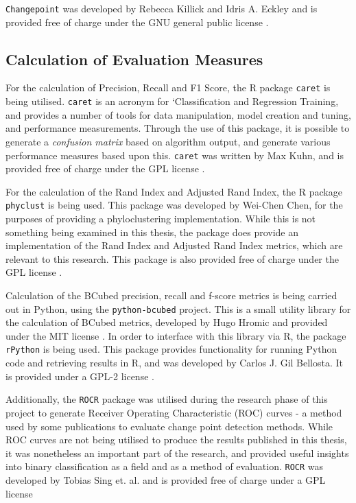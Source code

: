 \documentclass[../main.tex]{subfiles}
\begin{document}
\texttt{Changepoint} was developed by Rebecca Killick and Idris A. Eckley and is provided free of charge under the GNU general public license \cite{Killick2014}.

\subsection{Calculation of Evaluation Measures}

For the calculation of Precision, Recall and F1 Score, the \textsf{R} package \texttt{caret} is being utilised. \texttt{caret} is an acronym for `Classification and Regression Training, and provides a number of tools for data manipulation, model creation and tuning, and performance measurements. Through the use of this package, it is possible to generate a \emph{confusion matrix} based on algorithm output, and generate various performance measures based upon this. \texttt{caret} was written by Max Kuhn, and is provided free of charge under the GPL license \cite{FromJedWing2017}.

For the calculation of the Rand Index and Adjusted Rand Index, the \textsf{R} package \texttt{phyclust} is being used. This package was developed by Wei-Chen Chen, for the purposes of providing a phyloclustering implementation. While this is not something being examined in this thesis, the package does provide an implementation of the Rand Index and Adjusted Rand Index metrics, which are relevant to this research. This package is also provided free of charge under the GPL license \cite{Chen2011}.

Calculation of the BCubed precision, recall and f-score metrics is being carried out in Python, using the \texttt{python-bcubed} project. This is a small utility library for the calculation of BCubed metrics, developed by Hugo Hromic and provided under the MIT license \cite{Hromic2016}. In order to interface with this library via \textsf{R}, the package \texttt{rPython} is being used. This package provides functionality for running Python code and retrieving results in \textsf{R}, and was developed by Carlos J. Gil Bellosta. It is provided under a GPL-2 license \cite{Bellosta2015}.

Additionally, the \texttt{ROCR} package was utilised during the research phase of this project to generate Receiver Operating Characteristic (ROC) curves - a method used by some publications to evaluate change point detection methods. While ROC curves are not being utilised to produce the results published in this thesis, it was nonetheless an important part of the research, and provided useful insights into binary classification as a field and as a method of evaluation. \texttt{ROCR} was developed by Tobias Sing et. al. and is provided free of charge under a GPL license \cite{Sing2005}
\end{document}
